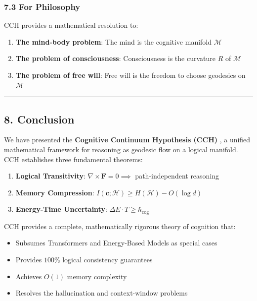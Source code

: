 \documentclass[
  11pt,
  a4paper,
]{article}
\providecommand{\tightlist}{%
  \setlength{\itemsep}{0pt}\setlength{\parskip}{0pt}}
\begin{document}
\subsubsection{7.3 For Philosophy}\label{for-philosophy}

CCH provides a mathematical resolution to:

\begin{enumerate}
\def\labelenumi{\arabic{enumi}.}
\tightlist
\item
  \textbf{The mind-body problem}: The mind is the cognitive manifold
  \(\mathcal{M}\)
\item
  \textbf{The problem of consciousness}: Consciousness is the curvature
  \(R\) of \(\mathcal{M}\)
\item
  \textbf{The problem of free will}: Free will is the freedom to choose
  geodesics on \(\mathcal{M}\)
\end{enumerate}

\begin{center}\rule{0.5\linewidth}{0.5pt}\end{center}

\subsection{8. Conclusion}\label{conclusion}

We have presented the \textbf{Cognitive Continuum Hypothesis (CCH)} , a
unified mathematical framework for reasoning as geodesic flow on a
logical manifold. CCH establishes three fundamental theorems:

\begin{enumerate}
\def\labelenumi{\arabic{enumi}.}
\tightlist
\item
  \textbf{Logical Transitivity}:
  \(\nabla \times \mathbf{F} = 0 \implies\) path-independent reasoning
\item
  \textbf{Memory Compression}:
  \(I(\mathbf{c}; \mathcal{H}) \geq H(\mathcal{H}) - O(\log d)\)
\item
  \textbf{Energy-Time Uncertainty}:
  \(\Delta E \cdot T \geq \hbar_{\text{cog}}\)
\end{enumerate}

CCH provides a complete, mathematically rigorous theory of cognition
that:

\begin{itemize}
\tightlist
\item
  Subsumes Transformers and Energy-Based Models as special cases
\item
  Provides \(100\%\) logical consistency guarantees
\item
  Achieves \(O(1)\) memory complexity
\item
  Resolves the hallucination and context-window problems
\end{itemize}
\end{document}
